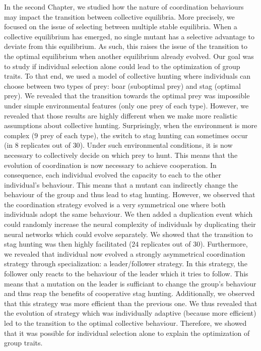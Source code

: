 		In the second Chapter, we studied how the nature of coordination behaviours may impact the transition between collective equilibria. More precisely, we focused on the issue of selecting between multiple stable equilibria. When a collective equilibrium has emerged, no single mutant has a selective advantage to deviate from this equilibrium. As such, this raises the issue of the transition to the optimal equilibrium when another equilibrium already evolved. Our goal was to study if individual selection alone could lead to the optimization of group traits. To that end, we used a model of collective hunting where individuals can choose between two types of prey: boar (suboptimal prey) and stag (optimal prey). We revealed that the transition towards the optimal prey was impossible under simple environmental features (only one prey of each type). However, we revealed that those results are highly different when we make more realistic assumptions about collective hunting. Surprisingly, when the environment is more complex ($9$ prey of each type), the switch to stag hunting can sometimes occur (in $8$ replicates out of $30$). Under such environmental conditions, it is now necessary to collectively decide on which prey to hunt. This means that the evolution of coordination is now necessary to achieve cooperation. In consequence, each individual evolved the capacity to each to the other individual's behaviour. This means that a mutant can indirectly change the behaviour of the group and thus lead to stag hunting. However, we observed that the coordination strategy evolved is a very symmetrical one where both individuals adopt the same behaviour. We then added a duplication event which could randomly increase the neural complexity of individuals by duplicating their neural networks which could evolve separately. We showed that the transition to stag hunting was then highly facilitated ($24$ replicates out of $30$). Furthermore, we revealed that individual now evolved a strongly asymmetrical coordination strategy through specialization: a leader/follower strategy. In this strategy, the follower only reacts to the behaviour of the leader which it tries to follow. This means that a mutation on the leader is sufficiant to change the group's behaviour and thus reap the benefits of cooperative stag hunting. Additionally, we observed that this strategy was more efficient than the previous one. We thus revealed that the evolution of strategy which was individually adaptive (because more efficient) led to the transition to the optimal collective behaviour. Therefore, we showed that it was possible for individual selection alone to explain the optimization of group traits.


